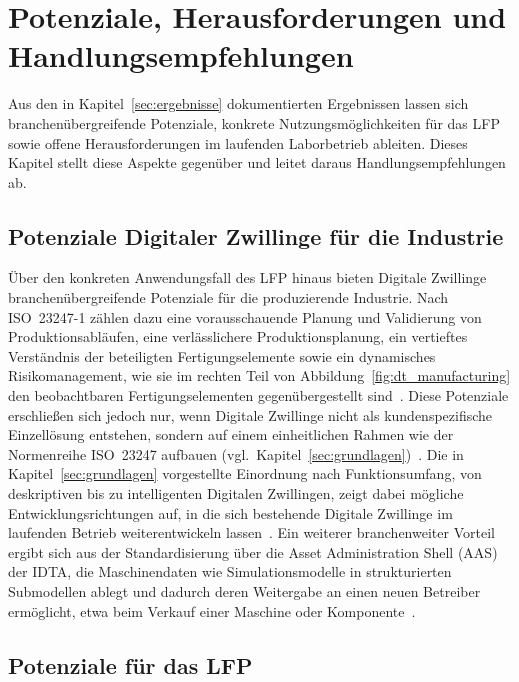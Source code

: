 \section{Potenziale, Herausforderungen und Handlungsempfehlungen}
\label{sec:potenziale}

Aus den in Kapitel~\ref{sec:ergebnisse} dokumentierten Ergebnissen lassen sich branchenübergreifende Potenziale, konkrete Nutzungsmöglichkeiten für das LFP sowie offene Herausforderungen im laufenden Laborbetrieb ableiten. Dieses Kapitel stellt diese Aspekte gegenüber und leitet daraus Handlungsempfehlungen ab.

\subsection{Potenziale Digitaler Zwillinge für die Industrie}

Über den konkreten Anwendungsfall des LFP hinaus bieten Digitale Zwillinge branchenübergreifende Potenziale für die produzierende Industrie.
Nach ISO~23247-1 zählen dazu eine vorausschauende Planung und Validierung von Produktionsabläufen, eine verlässlichere Produktionsplanung, ein vertieftes Verständnis der beteiligten Fertigungselemente sowie ein dynamisches Risikomanagement, wie sie im rechten Teil von Abbildung~\ref{fig:dt_manufacturing} den beobachtbaren Fertigungselementen gegenübergestellt sind~\cite{iso23247}.
Diese Potenziale erschließen sich jedoch nur, wenn Digitale Zwillinge nicht als kundenspezifische Einzellösung entstehen, sondern auf einem einheitlichen Rahmen wie der Normenreihe ISO~23247 aufbauen (vgl.\ Kapitel~\ref{sec:grundlagen})~\cite{shao2023standardized}.
Die in Kapitel~\ref{sec:grundlagen} vorgestellte Einordnung nach Funktionsumfang, von deskriptiven bis zu intelligenten Digitalen Zwillingen, zeigt dabei mögliche Entwicklungsrichtungen auf, in die sich bestehende Digitale Zwillinge im laufenden Betrieb weiterentwickeln lassen~\cite{shao2023standardized}.
Ein weiterer branchenweiter Vorteil ergibt sich aus der Standardisierung über die Asset Administration Shell (AAS) der IDTA, die Maschinendaten wie Simulationsmodelle in strukturierten Submodellen ablegt und dadurch deren Weitergabe an einen neuen Betreiber ermöglicht, etwa beim Verkauf einer Maschine oder Komponente~\cite{zhang2025aas}.

\subsection{Potenziale für das LFP}

